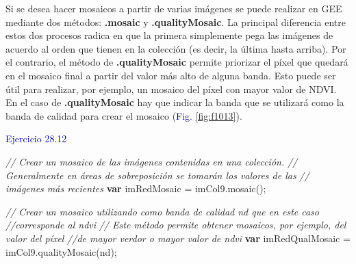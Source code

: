 \documentclass[
  12pt,
  letterpaper,
  twoside]{book}
\newenvironment{Shaded}{\begin{snugshade}}{\end{snugshade}}
\newcommand{\CommentTok}[1]{\textcolor[rgb]{0.24,0.58,0.00}{\textit{#1}}}
\newcommand{\ControlFlowTok}[1]{\textcolor[rgb]{0.00,0.00,0.00}{\textbf{#1}}}
\newcommand{\FunctionTok}[1]{\textcolor[rgb]{0.48,0.12,0.64}{#1}}
\newcommand{\NormalTok}[1]{#1}
\newcommand{\OperatorTok}[1]{\textcolor[rgb]{0.00,0.00,0.00}{#1}}
\newcommand{\StringTok}[1]{\textcolor[rgb]{0.87,0.29,0.22}{#1}}
\newcommand\boldpurple[1]{\textcolor{darkpurple}{\textbf{#1}}}
\begin{document}
Si se desea hacer mosaicos a partir de varias imágenes se puede realizar en GEE mediante dos métodos: \boldpurple{.mosaic} y \boldpurple{.qualityMosaic}. La principal diferencia entre estos dos procesos radica en que la primera simplemente pega las imágenes de acuerdo al orden que tienen en la colección (es decir, la última hasta arriba). Por el contrario, el método de \boldpurple{.qualityMosaic} permite priorizar el píxel que quedará en el mosaico final a partir del valor más alto de alguna banda. Esto puede ser útil para realizar, por ejemplo, un mosaico del píxel con mayor valor de NDVI. En el caso de \boldpurple{.qualityMosaic} hay que indicar la banda que se utilizará como la banda de calidad para crear el mosaico (\textcolor{darkblue}{Fig.} \ref{fig:f1013}).

\textcolor{darkblue}{Ejercicio 28.12}

\begin{Shaded}
\begin{Highlighting}[]
\CommentTok{// Crear un mosaico de las imágenes contenidas en una colección. }
\CommentTok{// Generalmente en áreas de sobreposición se tomarán los valores de las }
\CommentTok{// imágenes más recientes}
\ControlFlowTok{var}\NormalTok{ imRedMosaic }\OperatorTok{=}\NormalTok{ imCol9}\OperatorTok{.}\FunctionTok{mosaic}\NormalTok{()}\OperatorTok{;}

\CommentTok{// Crear un mosaico utilizando como banda de calidad \textquotesingle{}nd\textquotesingle{} que en este caso}
\CommentTok{//corresponde al ndvi}
\CommentTok{// Este método permite obtener mosaicos, por ejemplo, del valor del píxel}
\CommentTok{//de mayor verdor o mayor valor de ndvi}
\ControlFlowTok{var}\NormalTok{ imRedQualMosaic }\OperatorTok{=}\NormalTok{ imCol9}\OperatorTok{.}\FunctionTok{qualityMosaic}\NormalTok{(}\StringTok{\textquotesingle{}nd\textquotesingle{}}\NormalTok{)}\OperatorTok{;}
\end{Highlighting}
\end{Shaded}
\end{document}

